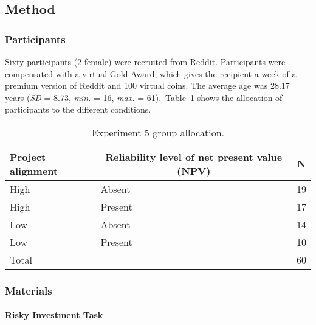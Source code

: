 \documentclass[a4paper, nobind]{templates/ociamthesis}
\theoremstyle{definition}
\theoremstyle{definition}
\theoremstyle{definition}
\theoremstyle{definition}
\theoremstyle{remark}
\begin{document}
\subsection{Method}

\subsubsection{Participants}

Sixty participants (2 female) were recruited from Reddit. Participants were compensated with a virtual Gold Award, which gives the recipient a week of a premium version of Reddit and 100 virtual coins. The average age was 28.17 years (\emph{SD} = 8.73, \emph{min.} = 16, \emph{max.} = 61).~Table~\ref{tab:condition-allocation-alignment-4}
shows the allocation of participants to the different conditions.

\begin{table}[tbp]

\begin{center}
\begin{threeparttable}

\caption{\label{tab:condition-allocation-alignment-4}Experiment 5 group allocation.}

\begin{tabular}{lll}
\toprule
Project alignment & \multicolumn{1}{c}{Reliability level of net present value (NPV)} & \multicolumn{1}{c}{N}\\
\midrule
High & Absent & 19\\
High & Present & 17\\
Low & Absent & 14\\
Low & Present & 10\\
Total &  & 60\\
\bottomrule
\end{tabular}

\end{threeparttable}
\end{center}

\end{table}

\subsubsection{Materials}

\paragraph{Risky Investment Task}
\end{document}
